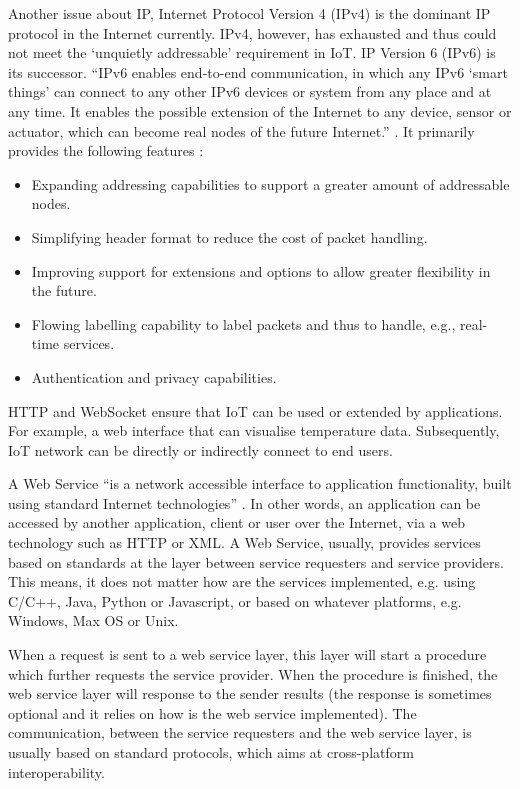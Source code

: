 Another issue about IP, Internet Protocol Version 4 (IPv4) is the dominant IP protocol in the Internet currently. IPv4, however, has exhausted \cite{smith2011free} and thus could not meet the `unquietly addressable' requirement in IoT. IP Version 6 (IPv6) is its successor. ``IPv6 enables end-to-end communication, in which any IPv6 `smart things' can connect to any other IPv6 devices or system from any place and at any time. It enables the possible extension of the Internet to any device, sensor or actuator, which can become real nodes of the future Internet.'' \cite{vermesan2011internet}. It primarily provides the following features \cite{deering1998internet}: 

\begin{itemize}
\setlength{\itemsep}{0pt}
\item Expanding addressing capabilities to support a greater amount of addressable nodes. 
\item Simplifying header format to reduce the cost of packet handling.
\item Improving support for extensions and options to allow greater flexibility in the future.
\item Flowing labelling capability to label packets and thus to handle, e.g., real-time services.
\item Authentication and privacy capabilities.
\end{itemize}

HTTP and WebSocket ensure that IoT can be used or extended by applications. For example, a web interface that can visualise temperature data. Subsequently, IoT network can be directly or indirectly connect to end users. 

A Web Service ``is a network accessible interface to application functionality, built using standard Internet technologies'' \cite{snell2009programming}. In other words, an application can be accessed by another application, client or user over the Internet, via a web technology such as HTTP or XML. A Web Service, usually, provides services based on standards at the layer between service requesters and service providers. This means, it does not matter how are the services implemented, e.g. using C/C++, Java, Python or Javascript, or based on whatever platforms, e.g. Windows, Max OS or Unix. 

When a request is sent to a web service layer, this layer will start a procedure which further requests the service provider. When the procedure is finished, the web service layer will response to the sender results (the response is sometimes optional and it relies on how is the web service implemented). The communication, between the service requesters and the web service layer, is usually based on standard protocols, which aims at cross-platform interoperability. 

